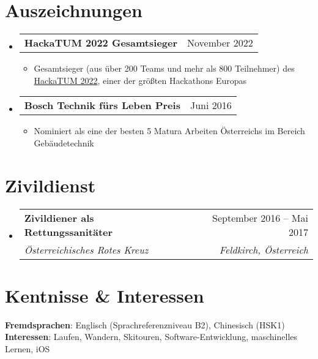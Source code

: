 \documentclass[letterpaper,11pt]{article}
\makeatletter
\newcommand{\resumeItem}[1]{
  \item\small{
    {#1 \vspace{-2pt}}
  }
}
\newcommand{\resumeSubheading}[4]{
  \vspace{-2pt}\item
    \begin{tabular*}{0.97\textwidth}[t]{l@{\extracolsep{\fill}}r}
      \textbf{#1} & #2 \\
      \textit{\small#3} & \textit{\small #4} \\
    \end{tabular*}\vspace{-7pt}
}
\newcommand{\resumeProjectHeading}[2]{
    \item
    \begin{tabular*}{0.97\textwidth}{l@{\extracolsep{\fill}}r}
      \small#1 & #2 \\
    \end{tabular*}\vspace{-7pt}
}
\newcommand{\resumeSubHeadingListStart}{\begin{itemize}[leftmargin=0.15in, label={}]}
\newcommand{\resumeSubHeadingListEnd}{\end{itemize}}
\newcommand{\resumeItemListStart}{\begin{itemize}}
\newcommand{\resumeItemListEnd}{\end{itemize}\vspace{-5pt}}
\makeatother
\begin{document}
\section{Auszeichnungen}
\resumeSubHeadingListStart
\resumeProjectHeading
{\textbf{HackaTUM 2022 Gesamtsieger}}{November 2022}
  \resumeItemListStart
    \resumeItem{Gesamtsieger (aus über 200 Teams und mehr als 800 Teilnehmer) des \href{https://devpost.com/software/sixtcharge}{HackaTUM 2022}, einer der größten Hackathons Europas}
  \resumeItemListEnd
  \resumeProjectHeading
  {\textbf{Bosch Technik fürs Leben Preis}}{Juni 2016}
  \resumeItemListStart
    \resumeItem{Nominiert als eine der besten 5 Matura Arbeiten Österreichs im Bereich Gebäudetechnik}
  \resumeItemListEnd
\resumeSubHeadingListEnd

\section{Zivildienst}
  \resumeSubHeadingListStart
    \resumeSubheading
      {Zivildiener als Rettungssanitäter}{September 2016 -- Mai 2017}
      {Österreichisches Rotes Kreuz}{Feldkirch, Österreich}
  \resumeSubHeadingListEnd

\section{Kentnisse \& Interessen}
 \begin{itemize}[leftmargin=0.15in, label={}]
    \small{\item{
      \textbf{Fremdsprachen}{: Englisch (Sprachreferenzniveau B2), Chinesisch (HSK1)} \\
     \textbf{Interessen}{: Laufen, Wandern, Skitouren, Software-Entwicklung, maschinelles Lernen, iOS}
    }}
 \end{itemize}

\end{document}
